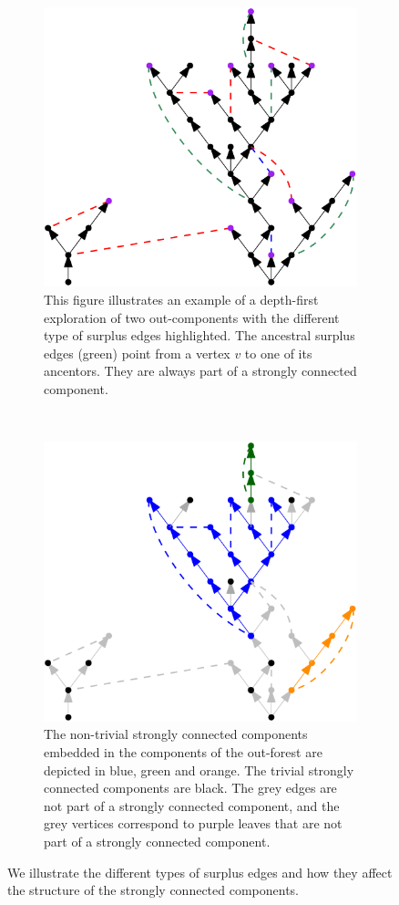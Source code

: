 \begin{figure}
\centering
\begin{subfigure}{0.7\textwidth}
 \centering
    \includegraphics[width=0.7\linewidth]{Content/Pictures/Types of surplus edges.png}
    \caption{This figure illustrates an example of a depth-first exploration of two out-components with the different type of surplus edges highlighted. The ancestral surplus edges (green) point from a vertex $v$ to one of its ancentors. They are always part of a strongly connected component.}
    \label{subfigure.typesofsurplusedges} 
\end{subfigure}\\
\begin{subfigure}{0.7\textwidth}
  \centering
  \includegraphics[width=0.7\linewidth]{Content/Pictures/SCC in example.png}
  \caption{The non-trivial strongly connected components embedded in the components of the out-forest are depicted in blue, green and orange. The trivial strongly connected components are black. The grey edges are not part of a strongly connected component, and the grey vertices correspond to purple leaves that are not part of a strongly connected component.}
    \label{subfigure.sccinexample}
\end{subfigure}
\caption{We illustrate the different types of surplus edges and how they affect the structure of the strongly connected components.}
\end{figure}

